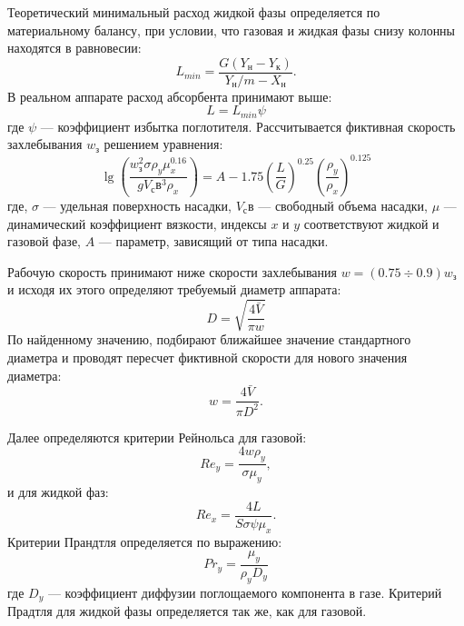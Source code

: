 Теоретический минимальный расход жидкой фазы определяется по материальному балансу, при условии, что газовая и жидкая фазы снизу колонны находятся в равновесии:
\begin{equation}
	L_{min} = \dfrac{G (Y_н - Y_к) } {Y_н /m - X_н}.
\end{equation}
В реальном аппарате расход абсорбента принимают выше:
\begin{equation}
	L = L_{min} \psi
\end{equation}
где $\psi$ --- коэффициент избытка поглотителя.
Рассчитывается фиктивная скорость захлебывания $w_з$ решением уравнения:
\begin{equation}
	\lg\left( \dfrac{w_з^2 \sigma \rho_y \mu_x^0.16} {g V_св^3 \rho_x} \right) = A -1.75 \left( \dfrac{L}{G} \right)^{0.25} \left( \dfrac{\rho_y}{\rho_x} \right)^{0.125}   
\end{equation}
где, $\sigma$ --- удельная поверхность насадки, $V_св$ --- свободный объема насадки, $\mu$ --- динамический коэффициент вязкости, индексы $x$ и $y$ соответствуют жидкой и газовой фазе, $A$ --- параметр, зависящий от типа насадки.

Рабочую скорость принимают ниже скорости захлебывания $w = (0.75 \div 0.9)w_з $ и исходя их этого определяют требуемый диаметр аппарата:
\begin{equation}
	D = \sqrt{\dfrac{4\bar{V}}{\pi w }}
\end{equation}
По найденному значению, подбирают ближайшее значение стандартного диаметра и проводят пересчет фиктивной скорости для нового значения диаметра:
\begin{equation}
	w = \dfrac{4 \bar{V}}{\pi D^2}.
\end{equation}

Далее определяются критерии Рейнольса для газовой:
\begin{equation}
	Re_y = \dfrac{4 w \rho_y}{\sigma \mu_y},
\end{equation}
и для жидкой фаз:
\begin{equation}
	Re_x = \dfrac{4 L}{S \sigma \psi \mu_x}.
\end{equation}
Критерии Прандтля определяется по выражению:
\begin{equation}
	Pr_y = \dfrac{\mu_y}{\rho_y D_y}
\end{equation}
где $D_y$ --- коэффициент диффузии поглощаемого компонента в газе. Критерий Прадтля для жидкой фазы определяется так же, как для газовой.


